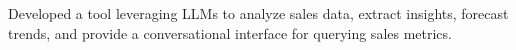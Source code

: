   {Developed a tool leveraging LLMs to analyze sales data, extract insights, forecast trends, and provide a conversational interface for querying sales metrics.}
